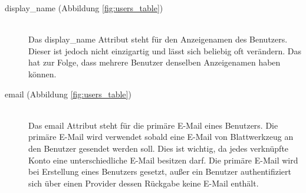 \documentclass[paper=a4,fontsize=12pt,parskip=half]{scrartcl}
\begin{document}
	\begin{description}
		\item[display\_name (Abbildung \ref{fig:users_table})]\hfill\\
		Das display\_name Attribut steht für den Anzeigenamen des Benutzers. Dieser ist jedoch nicht einzigartig und lässt sich beliebig oft verändern. Das hat zur Folge, dass mehrere Benutzer denselben Anzeigenamen haben können.
		\item[email (Abbildung \ref{fig:users_table})]\hfill\\
		Das email Attribut steht für die primäre E-Mail eines Benutzers. Die primäre E-Mail wird verwendet sobald eine E-Mail von Blattwerkzeug an den Benutzer gesendet werden soll. Dies ist wichtig, da jedes verknüpfte Konto eine unterschiedliche E-Mail besitzen darf. Die primäre E-Mail wird bei Erstellung eines Benutzers gesetzt, außer ein Benutzer authentifiziert sich über einen Provider dessen Rückgabe keine E-Mail enthält.
	\end{description}
\end{document}
